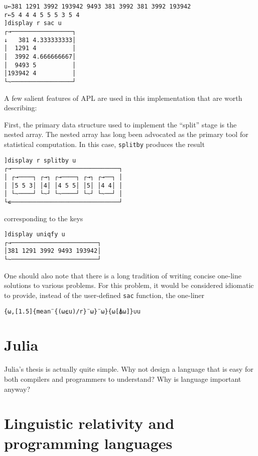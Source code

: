 \documentclass{article}
\begin{document}
\begin{lstlisting}
u←381 1291 3992 193942 9493 381 3992 381 3992 193942
r←5 4 4 4 5 5 5 3 5 4
]display r sac u
┌→─────────────────┐
↓   381 4.333333333│
│  1291 4          │
│  3992 4.666666667│
│  9493 5          │
│193942 4          │
└~─────────────────┘
\end{lstlisting}

A few salient features of APL are used in this implementation that are worth describing:

First, the primary data structure used to implement the ``split'' stage is the nested array. The nested array has long been advocated as the primary tool for statistical computation\cite{Anscombe1981,Friendly1994}. In this case, \lstinline|splitby| produces the result

\begin{lstlisting}
]display r splitby u
┌→──────────────────────────────┐
│ ┌→────┐ ┌→┐ ┌→────┐ ┌→┐ ┌→──┐ │
│ │5 5 3│ │4│ │4 5 5│ │5│ │4 4│ │
│ └~────┘ └~┘ └~────┘ └~┘ └~──┘ │
└∊──────────────────────────────┘
\end{lstlisting}

corresponding to the keys

\begin{lstlisting}
]display uniqfy u
┌→────────────────────────┐
│381 1291 3992 9493 193942│
└~────────────────────────┘
\end{lstlisting}

One should also note that there is a long tradition of writing concise one-line solutions to various problems. For this problem, it would be considered idiomatic to provide, instead of the user-defined \lstinline|sac| function, the one-liner

\begin{lstlisting}
{⍵,[1.5]{mean¨{(⍵⍷u)/r}¨⍵}¨⍵}{⍵[⍋⍵]}∪u
\end{lstlisting}

\section{Julia}

Julia's thesis is actually quite simple.
Why not design a language that is easy for both compilers and programmers to understand?
Why is language important anyway?

\section{Linguistic relativity and programming languages}
\end{document}

